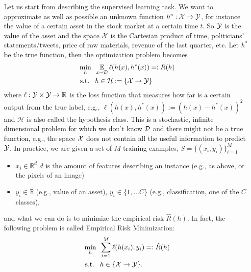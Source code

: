 \documentclass[10pt,a4paper]{article}
\begin{document}
\begin{example} Let us start from describing the supervised learning task. We want to approximate as well as possible an unknown function $h^*:\mathcal{X}\to\mathcal{Y}$, for instance the value of a certain asset in the stock market at a certain time $t$. So $\mathcal{Y}$ is the value of the asset and the space $\mathcal{X}$ is the Cartesian product of time, politicians' statements/tweets, price of raw materials, revenue of the last quarter, etc. Let $h^*$ be the true function, then the optimization problem becomes
	\begin{equation*}
		\begin{split}
			\min_{h} \;\; &\operatorname*{\mathbb{E}}_{x\sim \mathcal{D}} \ell(h(x),h^*(x))=:R(h)\\
			\text{s.t.} \;\;\;& h \in \mathcal{H}:=\{\mathcal{X}\to \mathcal{Y}\}
		\end{split}
	\end{equation*}
where $\ell:\mathcal{Y}\times\mathcal{Y}\to \mathbb{R}$ is the loss function that measures how far is a certain output from the true label, e.g., $\ell(h(x),h^*(x)):=(h(x)-h^*(x))^2$ and $\mathcal{H}$ is also called the hypothesis class. This is a stochastic, infinite dimensional problem for which we don't know $\mathcal{D}$ and there might not be a true function, e.g., the space $\mathcal{X}$ does not contain all the useful information to predict $\mathcal{Y}$. In practice, we are given a set of $M$ training examples, $S=\{(x_i, y_i)\}_{i=1}^{M}$
\begin{itemize}
	\item $x_i \in \mathbb{R}^{d}$ $d$ is the amount of features describing an instance (e.g., as above, or the pixels of an image)
	\item $y_i\in\mathbb{R}$ (e.g., value of an asset), $y_i\in\{1,\dots C\}$ (e.g., classification, one of the $C$ classes),
\end{itemize}
 and what we can do is to minimize the empirical risk $\hat{R}(h)$. In fact, the following problem is called Empirical Risk Minimization:
\begin{equation*}
	\begin{split}
		\min_{h} \;\; &\sum_{i=1}^M \ell(h(x_i),y_i)=:\hat{R}(h)\\
		\text{s.t.} \;\;\;& h \in \{\mathcal{X}\to \mathcal{Y}\}.
	\end{split}
\end{equation*}

\end{example}
\end{document}
